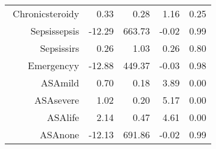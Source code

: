 \begin{tabular}{rrrrr}
$$  Chronic\-steroid\-y & 0.33 & 0.28 & 1.16 & 0.25 \\ 
  Sepsis\-sepsis & -12.29 & 663.73 & -0.02 & 0.99 \\ 
  Sepsis\-sirs & 0.26 & 1.03 & 0.26 & 0.80 \\ 
  Emergency\-y & -12.88 & 449.37 & -0.03 & 0.98 \\ 
  ASA\-mild & 0.70 & 0.18 & 3.89 & 0.00 \\ 
  ASA\-severe & 1.02 & 0.20 & 5.17 & 0.00 \\ 
  ASA\-life & 2.14 & 0.47 & 4.61 & 0.00 \\ 
  ASA\-none & -12.13 & 691.86 & -0.02 & 0.99 \\ 
   \hline
\end{tabular}

